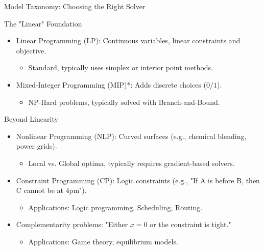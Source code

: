 \documentclass[presentation, aspectratio=169]{beamer}
\begin{document}
\begin{frame}[label={sec:org9f6d112}]{Model Taxonomy: Choosing the Right Solver}
\begin{block}{The "Linear" Foundation}
\begin{itemize}
\item \alert{Linear Programming (LP)}: Continuous variables, linear constraints and objective.
\begin{itemize}
\item Standard, typically uses simplex or interior point methods.
\end{itemize}
\item \alert{Mixed-Integer Programming (MIP)*}: Adds discrete choices (\(0/1\)).
\begin{itemize}
\item NP-Hard problems, typically solved with Branch-and-Bound.
\end{itemize}
\end{itemize}
\end{block}

\begin{block}{Beyond Linearity}
\begin{itemize}
\item \alert{Nonlinear Programming (NLP)}: Curved surfaces (e.g., chemical blending, power grids).
\begin{itemize}
\item Local vs. Global optima, typically requires gradient-based solvers.
\end{itemize}
\item \alert{Constraint Programming (CP)}: Logic constraints (e.g., "If A is before B, then C cannot be at 4pm").
\begin{itemize}
\item Applications: Logic programming, Scheduling, Routing.
\end{itemize}
\item \alert{Complementarity problems}: "Either \(x=0\) or the constraint is tight."
\begin{itemize}
\item Applications: Game theory, equilibrium models.
\end{itemize}
\end{itemize}
\end{block}
\end{frame}
\end{document}
